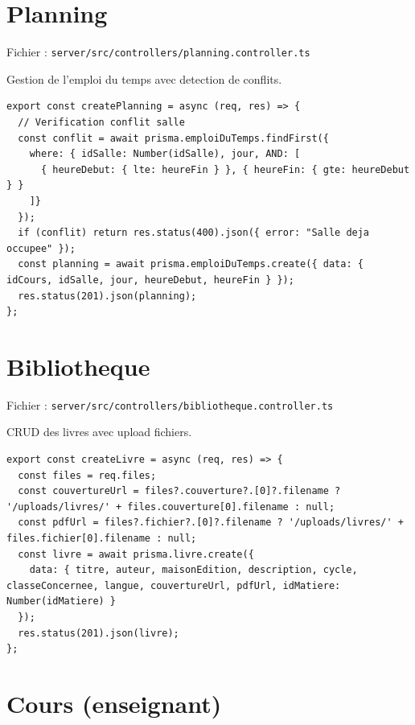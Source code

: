 \documentclass[12pt,a4paper]{article}
\begin{document}
\section{Planning}

Fichier : \texttt{server/src/controllers/planning.controller.ts}

Gestion de l'emploi du temps avec detection de conflits.

\begin{lstlisting}[style=code]
export const createPlanning = async (req, res) => {
  // Verification conflit salle
  const conflit = await prisma.emploiDuTemps.findFirst({
    where: { idSalle: Number(idSalle), jour, AND: [
      { heureDebut: { lte: heureFin } }, { heureFin: { gte: heureDebut } }
    ]}
  });
  if (conflit) return res.status(400).json({ error: "Salle deja occupee" });
  const planning = await prisma.emploiDuTemps.create({ data: { idCours, idSalle, jour, heureDebut, heureFin } });
  res.status(201).json(planning);
};
\end{lstlisting}

\newpage

\section{Bibliotheque}

Fichier : \texttt{server/src/controllers/bibliotheque.controller.ts}

CRUD des livres avec upload fichiers.

\begin{lstlisting}[style=code]
export const createLivre = async (req, res) => {
  const files = req.files;
  const couvertureUrl = files?.couverture?.[0]?.filename ? '/uploads/livres/' + files.couverture[0].filename : null;
  const pdfUrl = files?.fichier?.[0]?.filename ? '/uploads/livres/' + files.fichier[0].filename : null;
  const livre = await prisma.livre.create({
    data: { titre, auteur, maisonEdition, description, cycle, classeConcernee, langue, couvertureUrl, pdfUrl, idMatiere: Number(idMatiere) }
  });
  res.status(201).json(livre);
};
\end{lstlisting}

\newpage

\section{Cours (enseignant)}
\end{document}
